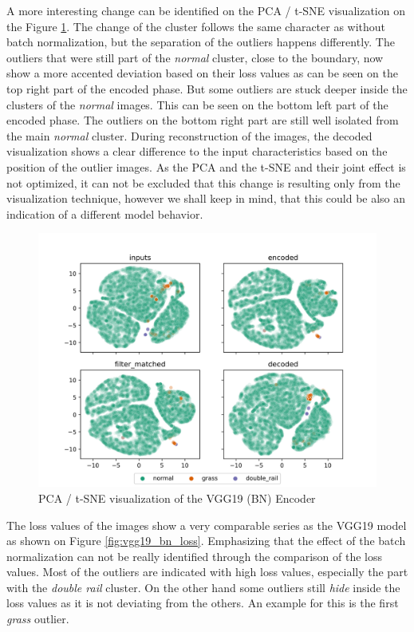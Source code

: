 A more interesting change can be identified on the PCA / t-SNE visualization on the
Figure \ref{fig:vgg19_bn_pca}.
The change of the cluster follows the same character as without batch normalization, but the separation
of the outliers happens differently.
The outliers that were still part of the \emph{normal} cluster, close to the boundary, now show a more
accented deviation based on their loss values as can be seen on the top right part of the encoded phase.
But some outliers are stuck deeper inside the clusters of the \emph{normal} images.
This can be seen on the bottom left part of the encoded phase.
The outliers on the bottom right part are still well isolated from the main \emph{normal} cluster.
During reconstruction of the images, the decoded visualization shows a clear difference to the input
characteristics based on the position of the outlier images.
As the PCA and the t-SNE and their joint effect is not optimized, it can not be excluded that this change
is resulting only from the visualization technique, however we shall keep in mind, that this could be
also an indication of a different model behavior.

\begin{figure}[!ht]
    \centering
    \includegraphics[width=\textwidth,trim={0 0 0 1cm},clip]{./results/vgg19_bn_vgg19/20230525_045131_feature_vectors_1.png}
    \caption{PCA / t-SNE visualization of the VGG19 (BN) Encoder}
    \label{fig:vgg19_bn_pca}
\end{figure}

The loss values of the images show a very comparable series as the VGG19 model as shown on Figure
\ref{fig:vgg19_bn_loss}.
Emphasizing that the effect of the batch normalization can not be really identified through the
comparison of the loss values.
Most of the outliers are indicated with high loss values, especially the part with the \emph{double rail}
cluster.
On the other hand some outliers still \emph{hide} inside the loss values as it is not deviating from
the others.
An example for this is the first \emph{grass} outlier.

